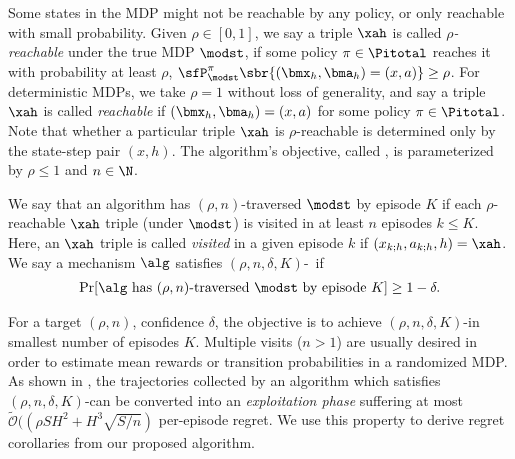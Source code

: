 









Some states in the MDP might not be reachable by any policy, or only reachable with small probability. Given $\rho\in [0,1]$, we say a triple $\xah$ is called \emph{$\rho$-reachable} under the true MDP $\modst$,  if some policy $\pi \in \Pitotal$ reaches it with probability at least $\rho$, \ie
    $\sfP_{\modst}^{\pi}\sbr{ (\bmx_h,\bma_h) = (x,a)} \ge \rho$. For deterministic MDPs, we take $\rho=1$ without loss of generality, and say
a triple $\xah$ is called \emph{reachable} if
    $(\bmx_h,\bma_h) = (x,a)$
for some policy $\pi \in \Pitotal$.
Note that whether a particular triple $\xah$ is $\rho$-reachable is determined only by the state-step pair $(x,h)$. The algorithm's objective, called \traversal, is parameterized by $\rho\leq 1$ and $n\in\N$.


\begin{definition} We say that an algorithm  has $(\rho,n)$-traversed $\modst$ by episode $K$ if each $\rho$-reachable $\xah$ triple (under $\modst$) is visited in at least $n$ episodes $k \le K$. Here, an $\xah$ triple is called \emph{visited} in a given episode $k$ if $ (x_{k;h},a_{k;h},h) = \xah$. We say a mechanism $\alg$ satisfies $(\rho,n,\delta,K)$-\traversal \ if
\begin{align}
\Pr[\alg \text{ has $(\rho,n)$-traversed } \modst \text{ by episode } K] \ge 1 -\delta.
\end{align}
\end{definition}
For a target $(\rho,n)$, confidence $\delta$, the objective is to achieve $(\rho,n,\delta,K)$-\traversal in smallest number of episodes $K$. Multiple visits ($n>1$) are usually desired in order to estimate mean rewards or transition probabilities in a randomized MDP. As shown in , the trajectories collected by an algorithm which satisfies $(\rho,n,\delta,K)$-\traversal can be converted into an \emph{exploitation phase} suffering at most $\tilde{\mathcal {O}}((\rho SH^2 + H^3\sqrt{S/n})$ per-episode regret. We use this property to derive regret corollaries from our proposed \mdphh algorithm.





